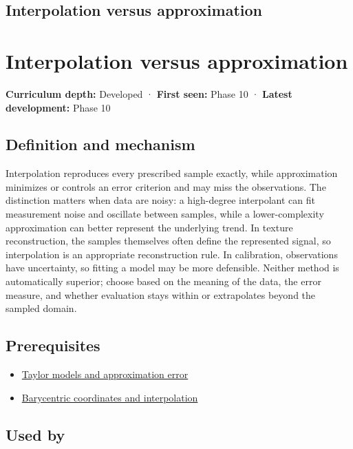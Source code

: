 \hypertarget{appendix-0c2a5f69851e}{}
\section*{Interpolation versus approximation}
\chapter{Interpolation versus approximation}\label{appendix-0c2a5f69851e-interpolation-versus-approximation}

\textbf{Curriculum depth:} Developed · \textbf{First seen:} Phase 10 · \textbf{Latest development:} Phase 10

\section{Definition and mechanism}\label{appendix-0c2a5f69851e-definition-and-mechanism}

Interpolation reproduces every prescribed sample exactly, while approximation minimizes or controls an error criterion and may miss the observations. The distinction matters when data are noisy: a high-degree interpolant can fit measurement noise and oscillate between samples, while a lower-complexity approximation can better represent the underlying trend. In texture reconstruction, the samples themselves often define the represented signal, so interpolation is an appropriate reconstruction rule. In calibration, observations have uncertainty, so fitting a model may be more defensible. Neither method is automatically superior; choose based on the meaning of the data, the error measure, and whether evaluation stays within or extrapolates beyond the sampled domain.

\section{Prerequisites}\label{appendix-0c2a5f69851e-prerequisites}

\begin{itemize}
\tightlist
\item
  \hyperref[appendix-32f39e9a3738]{Taylor models and approximation error}
\item
  \hyperref[appendix-02b9d9a81dca]{Barycentric coordinates and interpolation}
\end{itemize}

\section{Used by}\label{appendix-0c2a5f69851e-used-by}


